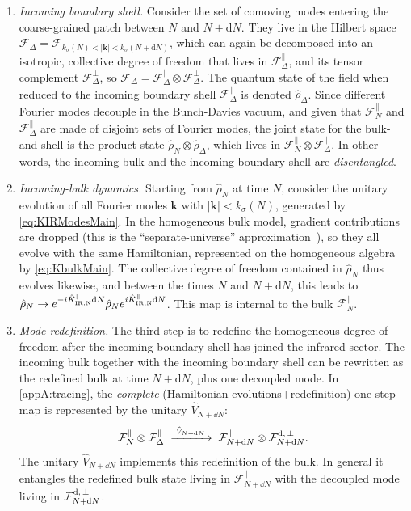 \documentclass{article}
\numberwithin{equation}{section}
\begin{document}
		\begin{enumerate}

			\item \textit{Incoming boundary shell.} Consider the set of comoving modes entering the coarse-grained patch between $N$ and $N+\mathrm{d}N$. They live in the Hilbert space $\mathcal{F}_\Delta = \mathcal{F}_{k_\sigma(N)<|\bm{k}| <  k_\sigma(N+\mathrm{d}N)}$, which can again be decomposed into an isotropic, collective degree of freedom that lives in $\mathcal{F}_\Delta^\parallel$, and its tensor complement  $\mathcal{F}_\Delta^\perp$, so  $\mathcal{F}_\Delta =\mathcal{F}_\Delta^\parallel \otimes \mathcal{F}_\Delta^\perp$. The quantum state of the field when reduced to the incoming boundary shell $\mathcal{F}_\Delta^\parallel$ is denoted $\hat{\rho}_\Delta$. Since different Fourier modes decouple in the Bunch-Davies vacuum, and given that $\mathcal{F}_N^\parallel$ and $\mathcal{F}_\Delta^\parallel$ are made of disjoint sets of Fourier modes, the joint state for the bulk-and-shell is the product state $\hat{\rho}_N\otimes\hat{\rho}_\Delta$, which lives in $\mathcal{F}_N^\parallel \otimes \mathcal{F}_\Delta^\parallel$. In other words, the incoming bulk and the incoming boundary shell are \textit{disentangled}.


			\item \textit{Incoming-bulk dynamics.} Starting from $\hat{\rho}_N$ at time $N$, consider the unitary evolution of all Fourier  modes $\bm{k}$ with $\vert\bm{k}\vert<k_\sigma(N)$, generated by \cref{eq:KIRModesMain}. In the homogeneous bulk model, gradient contributions are dropped (this is the ``separate-universe'' approximation~\cite{Salopek:1990, Sasaki:1995, Wands:2000, Lyth:2003, Rigopoulos:2003, Lyth:2005}), so they all evolve with the same Hamiltonian, represented on the homogeneous algebra by \cref{eq:KbulkMain}.
			The collective degree of freedom contained in  $\hat{\rho}_N$ thus evolves likewise, and between the times $N$ and $N+\mathrm{d}N$, this leads to $\hat{\rho}_N\to e^{-i\hat K_{\rm IR, N}^{\parallel}\mathrm{d}N}\hat{\rho}_N e^{i\hat K_{\rm IR, N}^{\parallel}\mathrm{d}N}$. This map is internal to the bulk $\mathcal{F}_N^\parallel$.


			\item \textit{Mode redefinition.} The  third step is to redefine the homogeneous degree of freedom after the incoming boundary shell has joined the infrared sector. The incoming bulk together with the incoming boundary shell can be rewritten as the redefined bulk at time \(N+\mathrm{d}N\), plus one decoupled mode. In \cref{appA:tracing}, the \textit{complete} (Hamiltonian evolutions$+$redefinition) one-step map is represented by the unitary \(\hat V_{N+\dd N}\):
			\[
			\mathcal F_N^\parallel\otimes\mathcal F_\Delta^\parallel
			\;\xrightarrow{\;\hat V_{N+\dd N}\;}\;
			\mathcal F_{N+\dd N}^\parallel
			\otimes
			\mathcal F^{\rm d,\, \perp}_{N+\dd N}.
			\]
			The unitary \(\hat V_{N+\dd N}\) implements this redefinition of the bulk. In general it entangles the redefined bulk state living in \(\mathcal F_{N+\dd N}^\parallel\) with the decoupled mode living in \(\mathcal F^{\rm d,\, \perp}_{N+\dd N}\).


\end{enumerate}
\end{document}
